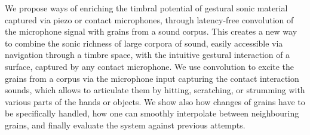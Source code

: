 We propose ways of enriching the timbral potential of gestural sonic material captured via piezo or contact microphones, through latency-free convolution of the microphone signal with grains from a sound corpus.
%
This creates a new way to combine the sonic richness of large corpora of sound, easily accessible via navigation through a timbre space, with the intuitive gestural interaction of a surface, captured by any contact microphone.
%
We use convolution to excite the grains from a corpus via the microphone input capturing the contact interaction sounds, which allows to articulate them by hitting, scratching, or strumming with various parts of the hands or objects.
%
We show also how changes of grains have to be specifically handled, how one can smoothly interpolate between neighbouring grains, and finally evaluate the system against previous attempts.
